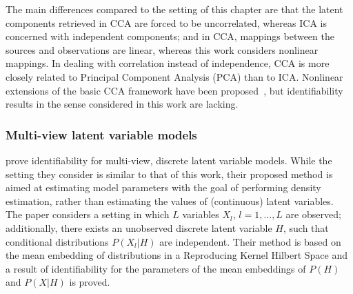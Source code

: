 The main differences compared to the setting of this chapter are that the latent components retrieved in CCA are forced to be uncorrelated, whereas ICA is concerned with independent components; and in CCA, mappings between the sources and observations are linear, whereas this work considers nonlinear mappings.
In dealing with correlation instead of independence, CCA is more closely related to Principal Component Analysis (PCA) than to ICA.
Nonlinear extensions of the basic CCA framework have been proposed~\citep{lai2000kernel, fukumizu2007statistical, andrew2013deep, michaeli2016nonparametric}, but identifiability results in the sense considered in this work are lacking.


%




\subsubsection{Multi-view latent variable models}



\cite{song2014nonparametric} prove identifiability for multi-view, discrete latent variable models.
While the setting they consider is similar to that of this work, their proposed method is aimed at estimating model parameters with the goal of performing density estimation, rather than estimating the values of (continuous) latent variables.
The paper considers a setting in which $L$ variables $X_l$, $l=1, \ldots, L$ are observed; additionally, there exists an unobserved discrete latent variable $H$, such that conditional distributions $P(X_l|H)$ are independent. 
Their method is based on the mean embedding of distributions in a Reproducing Kernel Hilbert Space and a result of identifiability for the parameters of the mean embeddings of $P(H)$ and $P(X|H)$ is proved.

